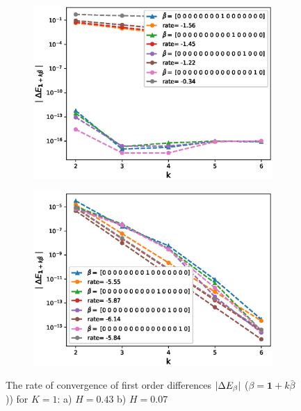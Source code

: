 \documentclass[11pt]{article}
\begin{document}
\begin{figure}[h!]
	\centering
	\begin{subfigure}{.5\textwidth}
		\centering
		\includegraphics[width=1\linewidth]{./figures/effect_H_differences/non_hierarchical/H_043/N_8/first_difference_rbergomi_8steps_H_043_K_1_non_hierarch_with_rate_W2.eps}
		\caption{}
		\label{fig:sub3}
	\end{subfigure}%
	\begin{subfigure}{.5\textwidth}
		\centering
		\includegraphics[width=1\linewidth]{./figures/effect_H_differences/non_hierarchical/H_007/N_8/first_difference_rbergomi_8steps_H_007_K_1_non_hierarch_with_rate_W2.eps}
		\caption{}
		\label{fig:sub4}
	\end{subfigure}
	
	\caption{The rate of convergence of  first order differences $\left\lvert\Delta E_{\beta}\right\rvert$ ($\beta=\mathbf{1}+k \bar{\beta}$)) for $K=1$: a) $H=0.43$ b)  $H=0.07$}
	\label{fig:test2}
\end{figure}
\end{document}
